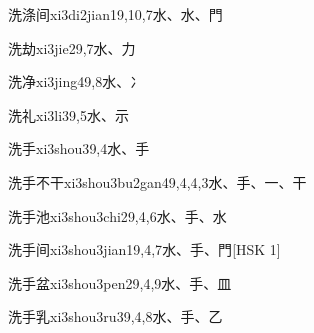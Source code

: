 \begin{EntryWithPhonetic}{洗涤间}{xi3di2jian1}{9,10,7}{⽔、⽔、⾨}
\end{EntryWithPhonetic}

\begin{EntryWithPhonetic}{洗劫}{xi3jie2}{9,7}{⽔、⼒}
\end{EntryWithPhonetic}

\begin{EntryWithPhonetic}{洗净}{xi3jing4}{9,8}{⽔、⼎}
\end{EntryWithPhonetic}

\begin{EntryWithPhonetic}{洗礼}{xi3li3}{9,5}{⽔、⽰}
\end{EntryWithPhonetic}

\begin{EntryWithPhonetic}{洗手}{xi3shou3}{9,4}{⽔、⼿}
\end{EntryWithPhonetic}

\begin{EntryWithPhonetic}{洗手不干}{xi3shou3bu2gan4}{9,4,4,3}{⽔、⼿、⼀、⼲}
\end{EntryWithPhonetic}

\begin{EntryWithPhonetic}{洗手池}{xi3shou3chi2}{9,4,6}{⽔、⼿、⽔}
\end{EntryWithPhonetic}

\begin{EntryWithPhonetic}{洗手间}{xi3shou3jian1}{9,4,7}{⽔、⼿、⾨}[HSK 1]
\end{EntryWithPhonetic}

\begin{EntryWithPhonetic}{洗手盆}{xi3shou3pen2}{9,4,9}{⽔、⼿、⽫}
\end{EntryWithPhonetic}

\begin{EntryWithPhonetic}{洗手乳}{xi3shou3ru3}{9,4,8}{⽔、⼿、⼄}
\end{EntryWithPhonetic}

